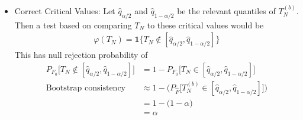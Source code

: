 \documentclass[12pt]{article}
\theoremstyle{plain}
\theoremstyle{definition}
\theoremstyle{remark}
\begin{document}
\begin{itemize}
  \item
    Correct Critical Values:
    Let $\hat{q}_{\alpha/2}$ and $\hat{q}_{1-\alpha/2}$ be the relevant
    quantiles of $T_N^{(b)}$.
    Then a test based on comparing $T_N$ to these critical
    values would be
    \begin{align*}
      \varphi(T_N)
      =
      \mathbf{1}\{T_N\not\in [\hat{q}_{\alpha/2},\hat{q}_{1-\alpha/2}]\}
    \end{align*}
    This has null rejection probability of
    \begin{align*}
      P_{F_0}\big[
        T_N\not\in [\hat{q}_{\alpha/2},\hat{q}_{1-\alpha/2}]
      \big]
      &=
      1-
      P_{F_0}\big[
        T_N\in [\hat{q}_{\alpha/2},\hat{q}_{1-\alpha/2}]
      \big]
      \\
      \text{Bootstrap consistency}
      \quad
      &\approx
      1-
      \bigg(
      P_{\hat{F}}\big[
        T_N^{(b)}\in [\hat{q}_{\alpha/2},\hat{q}_{1-\alpha/2}]
      \big]
      \bigg)
      \\
      &=
      1-
      \bigg(
      1-\alpha
      \bigg)
      \\
      &=
      \alpha
    \end{align*}



\end{itemize}
\end{document}
